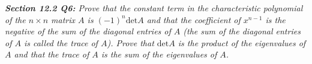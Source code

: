 \documentclass{article}
\begin{document}
\it \textbf{Section 12.2 Q6:} Prove that the constant term in the
  characteristic polynomial of the $n\times n$ matrix $A$ is
  $(-1)^n\text{det}A$ and that the coefficient of $x^{n-1}$ is the negative
  of the sum of the diagonal entries of $A$ (the sum of the diagonal
  entries of $A$ is called the trace of $A$). Prove that $\text{det}A$ is
  the product of the eigenvalues of $A$ and that the trace of $A$ is the
  sum of the eigenvalues of $A$.
\end{document}
